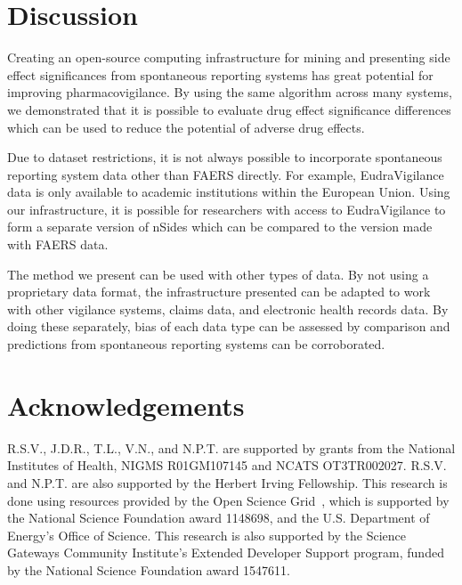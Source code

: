 \documentclass{ws-procs11x85}
\begin{document}
\section{Discussion}

Creating an open-source computing infrastructure for mining and
presenting side effect significances from spontaneous reporting
systems has great potential for improving pharmacovigilance. By using
the same algorithm across many systems, we demonstrated that it is
possible to evaluate drug effect significance differences which can be
used to reduce the potential of adverse drug effects.

Due to dataset restrictions, it is not always possible to incorporate
spontaneous reporting system data other than FAERS directly. For
example, EudraVigilance data is only available to academic
institutions within the European Union. Using our infrastructure, it
is possible for researchers with access to EudraVigilance to form a
separate version of nSides which can be compared to the version made
with FAERS data.

The method we present can be used with other types of data. By not
using a proprietary data format, the infrastructure presented can be
adapted to work with other vigilance systems, claims data, and
electronic health records data. By doing these separately, bias of
each data type can be assessed by comparison and predictions from
spontaneous reporting systems can be corroborated.

\section{Acknowledgements}
R.S.V., J.D.R., T.L., V.N., and N.P.T. are supported by grants from
the National Institutes of Health, NIGMS R01GM107145 and NCATS
OT3TR002027. R.S.V. and N.P.T. are also supported by the Herbert
Irving Fellowship. This research is done using resources provided by
the Open Science Grid~\cite{pordes2007open, sfiligoi2009pilot}, which
is supported by the National Science Foundation award 1148698, and the
U.S. Department of Energy's Office of Science.  This research is also
supported by the Science Gateways Community Institute's Extended
Developer Support program, funded by the National Science Foundation
award 1547611.







\end{document}
